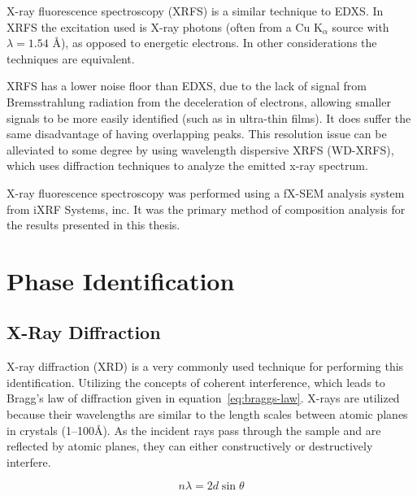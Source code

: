 X-ray fluorescence spectroscopy (XRFS) is a similar technique to EDXS. In XRFS the excitation used is X-ray photons (often from a Cu K$_{\alpha}$ source with $\lambda = 1.54$ \AA), as opposed to energetic electrons. In other considerations the techniques are equivalent. 

XRFS has a lower noise floor than EDXS, due to the lack of signal from Bremsstrahlung radiation from the deceleration of electrons, allowing smaller signals to be more easily identified (such as in ultra-thin films). It does suffer the same disadvantage of having overlapping peaks. This resolution issue can be alleviated to some degree by using wavelength dispersive XRFS (WD-XRFS), which uses diffraction techniques to analyze the emitted x-ray spectrum.\cite{Vincze_XRF_2005} 

X-ray fluorescence spectroscopy was performed using a fX-SEM analysis system from iXRF Systems, inc.\cite{iXRF-web}  It was the primary method of composition analysis for the results presented in this thesis.



	
\section{Phase Identification}
\label{sec:Charact-PhaseID}


\subsection{X-Ray Diffraction}

X-ray diffraction (XRD) is a very commonly used technique for performing this identification. Utilizing the concepts of coherent interference, which leads to Bragg's law of diffraction given in equation~\vref{eq:braggs-law}. X-rays are utilized because their wavelengths are similar to the length scales between atomic planes in crystals (1--100\AA). As the incident rays pass through the sample and are reflected by atomic planes, they can either constructively or destructively interfere.\cite{giacovazzo_XRD_1992} 

\begin{equation}
 \label{eq:braggs-law}
 \displaystyle
	n\lambda = 2d\sin\theta
\end{equation}

